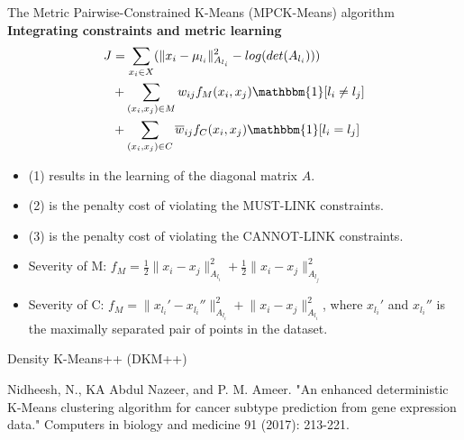 \documentclass{beamer}
\newlength{\tmpShadow}
\newcommand{\MyShadow}[2]{%
	\settowidth{\tmpShadow}{#1}
	\addtolength{\tmpShadow}{.1em}
	\raisebox{-0.25ex}{\textcolor{gray!70}{#1}}%
	\kern-\tmpShadow%
	\textcolor{#2}{#1}%
}
\newcounter{mycounter}
\newenvironment{noindlist}
{\begin{list}{}{\usecounter{mycounter} \labelsep=0em \labelwidth=0em \leftmargin=0em \itemindent=0em}}
	{\end{list}}
\begin{document}
{\begin{frame}{The Metric Pairwise-Constrained K-Means (MPCK-Means) algorithm}
	\textbf{Integrating constraints and metric learning}
	\setcounter{equation}{0}
	\begin{align}\label{eq2}
		J &= \sum_{x_i \in X} (\lVert x_i - \mu_{l_i} \rVert_{A_{l_i}}^2 -log(det(A_{l_i}))  ) \\
		& + \sum_{(x_i,x_j)\in M}w_{ij}f_M(x_i,x_j)\mathbbm{1}[l_i \neq l_j] \\
		& + \sum_{(x_i,x_j)\in C}\overline{w}_{ij}f_C(x_i,x_j)\mathbbm{1}[l_i = l_j] %
	\end{align}	
	\begin{itemize}
		\item<2-> (1) results in the learning of the diagonal matrix $A$. 
		\item<2-> (2) is the penalty cost of violating the MUST-LINK constraints.
		\item<2-> (3) is the penalty cost of violating the CANNOT-LINK constraints.
	\end{itemize}	
	\begin{itemize}[label={\MyShadow{$\bullet$}{blue!80}}]
		\item<3-> Severity of M: $f_M = \frac{1}{2}\lVert x_i - x_j \rVert_{A_{l_i}}^2 + \frac{1}{2}\lVert x_i - x_j \rVert_{A_{l_j}}^2$
		\item<3-> Severity of C: $f_M = \lVert x_{l_i}' - x_{l_i}'' \rVert_{A_{l_i}}^2 + \lVert x_i - x_j \rVert_{A_{l_i}}^2$, where $x_{l_i}'$ and $x_{l_i}''$ is the maximally separated pair of points in the dataset.		
	\end{itemize}		
\end{frame}

\begin{frame}[plain,c]\label{DKMPP}
	\vspace{25mm}
	\begin{center}
		\Huge Density K-Means++ (DKM++)
	\end{center}
	\vspace{35mm}
	\begin{tiny}
		\begin{noindlist}
			\item Nidheesh, N., KA Abdul Nazeer, and P. M. Ameer. "An enhanced deterministic K-Means clustering algorithm for cancer subtype prediction from gene expression data." Computers in biology and medicine 91 (2017): 213-221.
		\end{noindlist}
	\end{tiny}	
\end{frame}

}
\end{document}
